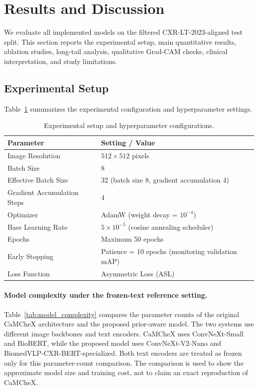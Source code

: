 \section{Results and Discussion}
\label{sec:results}

We evaluate all implemented models on the filtered CXR-LT-2023-aligned test split. This section reports the experimental setup, main quantitative results, ablation studies, long-tail analysis, qualitative Grad-CAM checks, clinical interpretation, and study limitations.

\subsection{Experimental Setup}
\label{subsec:results_setup}

Table~\ref{tab:experimental_setup} summarizes the experimental configuration and hyperparameter settings.

\begin{table}[H]
    \centering
    \caption{Experimental setup and hyperparameter configurations.}
    \label{tab:experimental_setup}
    \begin{tabular}{ll}
        \toprule
        \textbf{Parameter} & \textbf{Setting / Value} \\
        \midrule
        Image Resolution & $512 \times 512$ pixels \\
        Batch Size & 8 \\
        Effective Batch Size & 32 (batch size 8, gradient accumulation 4) \\
        Gradient Accumulation Steps & 4 \\
        Optimizer & AdamW (weight decay = $10^{-4}$) \\
        Base Learning Rate & $5\times10^{-5}$ (cosine annealing scheduler) \\
        Epochs & Maximum 50 epochs \\
        Early Stopping & Patience = 10 epochs (monitoring validation mAP) \\
        Loss Function & Asymmetric Loss (ASL) \\
        \bottomrule
    \end{tabular}
\end{table}

\paragraph{Model complexity under the frozen-text reference setting.}
Table~\ref{tab:model_complexity} compares the parameter counts of the original CaMCheX architecture and the proposed prior-aware model. The two systems use different image backbones and text encoders. CaMCheX uses ConvNeXt-Small and BioBERT, while the proposed model uses ConvNeXt-V2-Nano and BiomedVLP-CXR-BERT-specialized. Both text encoders are treated as frozen only for this parameter-count comparison. The comparison is used to show the approximate model size and training cost, not to claim an exact reproduction of CaMCheX.

